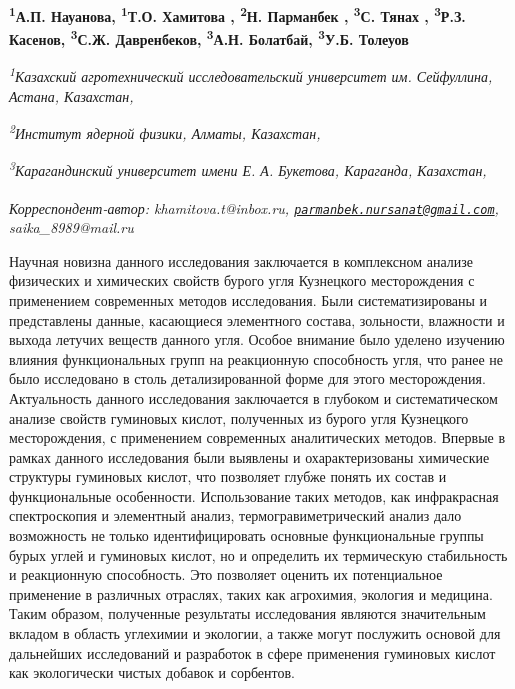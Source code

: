 
\begin{articleheader}

{\bfseries
\textsuperscript{1}А.П. Науанова\authorid,
\textsuperscript{1}Т.О. Хамитова\textsuperscript{\envelope } \authorid,
\textsuperscript{2}Н. Парманбек\textsuperscript{\envelope } \authorid,
\textsuperscript{3}С. Тянах\textsuperscript{\envelope } \authorid,
\textsuperscript{3}Р.З. Касенов\authorid,
\textsuperscript{3}С.Ж. Давренбеков\authorid,
\textsuperscript{3}А.Н. Болатбай\authorid,
\textsuperscript{3}У.Б. Толеуов\authorid}
\end{articleheader}

\begin{affiliation}
\emph{\textsuperscript{1}Казахский агротехнический исследовательский университет им. Сейфуллина, Астана, Казахстан,}

\emph{\textsuperscript{2}Институт ядерной физики, Алматы, Казахстан,}

\emph{\textsuperscript{3}Карагандинский университет имени Е. А. Букетова, Караганда, Казахстан,}

\raggedright \textsuperscript{\envelope }{\em Корреспондент-автор: \emph{khamitova.t@inbox.ru, \href{mailto:parmanbek.nursanat@gmail.com}{\nolinkurl{parmanbek.nursanat@gmail.com}}, saika\_8989@mail.ru}}
\end{affiliation}

Научная новизна данного исследования заключается в комплексном анализе
физических и химических свойств бурого угля Кузнецкого месторождения с
применением современных методов исследования. Были систематизированы и
представлены данные, касающиеся элементного состава, зольности,
влажности и выхода летучих веществ данного угля. Особое внимание было
уделено изучению влияния функциональных групп на реакционную способность
угля, что ранее не было исследовано в столь детализированной форме для
этого месторождения. Актуальность данного исследования заключается в
глубоком и систематическом анализе свойств гуминовых кислот, полученных
из бурого угля Кузнецкого месторождения, с применением современных
аналитических методов. Впервые в рамках данного исследования были
выявлены и охарактеризованы химические структуры гуминовых кислот, что
позволяет глубже понять их состав и функциональные особенности.
Использование таких методов, как инфракрасная спектроскопия и элементный
анализ, термогравиметрический анализ дало возможность не только
идентифицировать основные функциональные группы бурых углей и гуминовых
кислот, но и определить их термическую стабильность и реакционную
способность. Это позволяет оценить их потенциальное применение в
различных отраслях, таких как агрохимия, экология и медицина. Таким
образом, полученные результаты исследования являются значительным
вкладом в область углехимии и экологии, а также могут послужить основой
для дальнейших исследований и разработок в сфере применения гуминовых
кислот как экологически чистых добавок и сорбентов.

